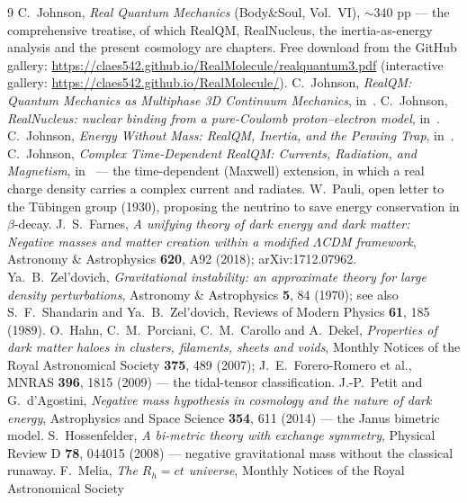 \documentclass[11pt]{article}
\begin{document}
\begin{thebibliography}{9}
 C.\ Johnson, \emph{Real Quantum Mechanics} (Body\&Soul, Vol.\ VI), ${\sim}340$ pp --- the
comprehensive treatise, of which RealQM, RealNucleus, the inertia-as-energy analysis and the present cosmology are
chapters. Free download from the GitHub gallery: \url{https://claes542.github.io/RealMolecule/realquantum3.pdf}
(interactive gallery: \url{https://claes542.github.io/RealMolecule/}).
 C.\ Johnson, \emph{RealQM: Quantum Mechanics as Multiphase 3D Continuum Mechanics}, in~\cite{realqmbook}.
 C.\ Johnson, \emph{RealNucleus: nuclear binding from a pure-Coulomb proton--electron model},
in~\cite{realqmbook}.
 C.\ Johnson, \emph{Energy Without Mass: RealQM, Inertia, and the Penning Trap}, in~\cite{realqmbook}.
 C.\ Johnson, \emph{Complex Time-Dependent RealQM: Currents, Radiation, and Magnetism},
in~\cite{realqmbook} --- the time-dependent (Maxwell) extension, in which a real charge density carries a complex
current and radiates.
 W.\ Pauli, open letter to the Tübingen group (1930), proposing the neutrino to save energy
conservation in $\beta$-decay.
 J.\ S.\ Farnes, \emph{A unifying theory of dark energy and dark matter: Negative masses and
matter creation within a modified $\Lambda$CDM framework}, Astronomy \& Astrophysics \textbf{620}, A92 (2018);
arXiv:1712.07962.
 Ya.\ B.\ Zel'dovich, \emph{Gravitational instability: an approximate theory for large density
perturbations}, Astronomy \& Astrophysics \textbf{5}, 84 (1970); see also S.\ F.\ Shandarin and Ya.\ B.\
Zel'dovich, Reviews of Modern Physics \textbf{61}, 185 (1989).
 O.\ Hahn, C.\ M.\ Porciani, C.\ M.\ Carollo and A.\ Dekel, \emph{Properties of dark matter haloes
in clusters, filaments, sheets and voids}, Monthly Notices of the Royal Astronomical Society \textbf{375}, 489
(2007); J.\ E.\ Forero-Romero et al., MNRAS \textbf{396}, 1815 (2009) --- the tidal-tensor classification.
\bibitem{petit} J.-P.\ Petit and G.\ d'Agostini, \emph{Negative mass hypothesis in cosmology and the nature of dark
energy}, Astrophysics and Space Science \textbf{354}, 611 (2014) --- the Janus bimetric model.
\bibitem{hossenfelder} S.\ Hossenfelder, \emph{A bi-metric theory with exchange symmetry}, Physical Review D
\textbf{78}, 044015 (2008) --- negative gravitational mass without the classical runaway.
\bibitem{melia} F.\ Melia, \emph{The $R_h=ct$ universe}, Monthly Notices of the Royal Astronomical Society

\end{thebibliography}
\end{document}
